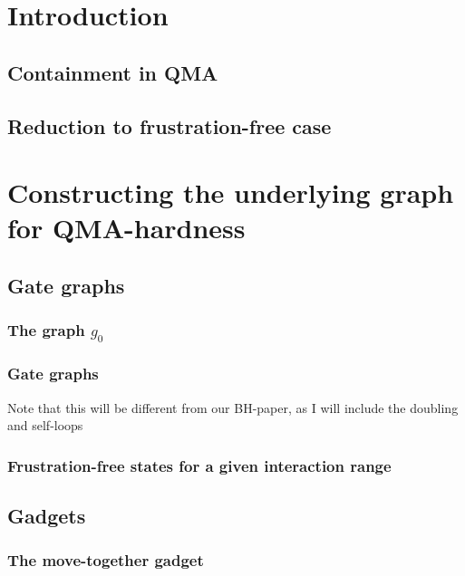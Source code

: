 % 


\section{Introduction}
\subsection{Containment in QMA}
\subsection{Reduction to frustration-free case}


\section{Constructing the underlying graph for QMA-hardness}

\subsection{Gate graphs}
\subsubsection{The graph $g_0$}

\subsubsection{Gate graphs}

Note that this will be different from our BH-paper, as I will include the doubling and self-loops

\subsubsection{Frustration-free states for a given interaction range}

\subsection{Gadgets}

\subsubsection{The move-together gadget}

